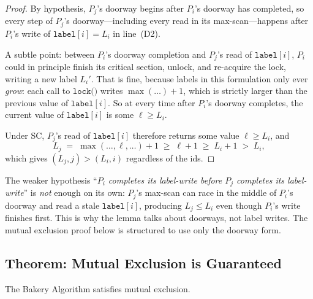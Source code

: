 \begin{proof}
By hypothesis, $P_j$'s doorway begins after $P_i$'s doorway has completed,
so every step of $P_j$'s doorway---including every read in its max-scan---happens
after $P_i$'s write of $\texttt{label}[i] = L_i$ in line~(D2).

A subtle point: between $P_i$'s doorway completion and $P_j$'s read of
$\texttt{label}[i]$, $P_i$ could in principle finish its critical section,
unlock, and re-acquire the lock, writing a new label $L_i'$. That is fine,
because labels in this formulation only ever \emph{grow}: each call to
$\texttt{lock()}$ writes $\max(\ldots) + 1$, which is strictly larger than
the previous value of $\texttt{label}[i]$. So at every time after $P_i$'s
doorway completes, the current value of $\texttt{label}[i]$ is some
$\ell \geq L_i$.

Under SC, $P_j$'s read of $\texttt{label}[i]$ therefore returns some value
$\ell \geq L_i$, and
\[
  L_j \;=\; \max(\ldots,\ell,\ldots) + 1 \;\geq\; \ell + 1 \;\geq\; L_i + 1
       \;>\; L_i,
\]
which gives $(L_j, j) > (L_i, i)$ regardless of the ids.
\end{proof}

\begin{ppnote}
\par
The weaker hypothesis ``\emph{$P_i$ completes its label-write before $P_j$
completes its label-write}'' is \emph{not} enough on its own: $P_j$'s
max-scan can race in the middle of $P_i$'s doorway and read a stale
$\texttt{label}[i]$, producing $L_j \leq L_i$ even though $P_i$'s write
finishes first. This is why the lemma talks about doorways, not label
writes. The mutual exclusion proof below is structured to use only the
doorway form.
\end{ppnote}

\subsection{Theorem: Mutual Exclusion is Guaranteed}

\begin{theorem}\label{thm:me}
The Bakery Algorithm satisfies mutual exclusion.
\end{theorem}

